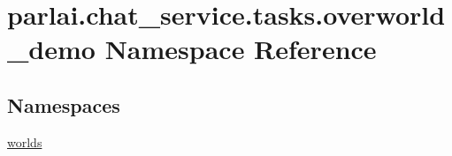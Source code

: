 \hypertarget{namespaceparlai_1_1chat__service_1_1tasks_1_1overworld__demo}{}\section{parlai.\+chat\+\_\+service.\+tasks.\+overworld\+\_\+demo Namespace Reference}
\label{namespaceparlai_1_1chat__service_1_1tasks_1_1overworld__demo}
\subsection*{Namespaces}
\begin{DoxyCompactItemize}
\item 
 \hyperlink{namespaceparlai_1_1chat__service_1_1tasks_1_1overworld__demo_1_1worlds}{worlds}
\end{DoxyCompactItemize}
